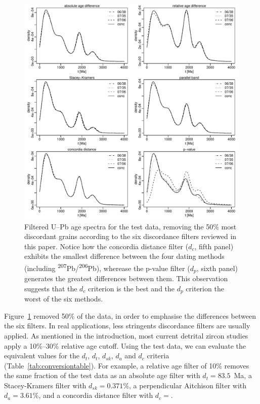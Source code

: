 \documentclass[gchron, manuscript]{copernicus}
\begin{document}
\begin{figure}[t]
  \includegraphics[width=12cm]{KDEs.pdf}
  \caption{Filtered U--Pb age spectra for the test data, removing the
    50\% most discordant grains according to the six discordance
    filters reviewed in this paper. Notice how the concordia distance
    filter ($d_c$, fifth panel) exhibits the smallest difference
    between the four dating methods (including
    \textsuperscript{207}Pb/\textsuperscript{206}Pb), wherease the
    p-value filter ($d_p$, sixth panel) generates the greatest
    differences between them.  This observation suggests that the
    $d_c$ criterion is the best and the $d_p$ criterion the worst of
    the six methods.
  }
  \label{fig:KDEs}
\end{figure}

Figure~\ref{fig:KDEs} removed 50\% of the data, in order to emphasise
the differences between the six filters. In real applications, less
stringents discordance filters are usually applied. As mentioned in
the introduction, most current detrital zircon studies apply a
10\%--30\% relative age cutoff.  Using the test data, we can evaluate
the equivalent values for the $d_t$, $d_t$, $d_{sk}$, $d_a$ and $d_c$
criteria (Table~\ref{tab:conversiontable}). For example, a relative
age filter of 10\% removes the same fraction of the test data as an
absolute age filter with $d_t=83.5$~Ma, a Stacey-Kramers filter with
$d_{sk}=0.371$\%, a perpendicular Aitchison filter with $d_a=3.61$\%,
and a concordia distance filter with $d_c=$.\\
\end{document}

